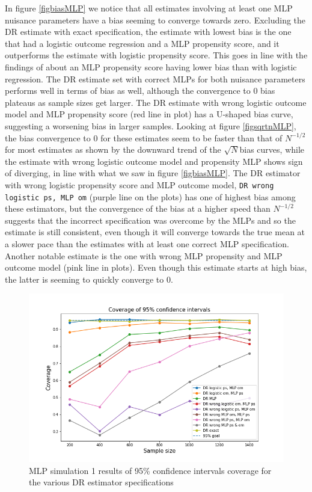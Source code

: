 \documentclass[12pt,twoside]{article}
\begin{document}
In figure \ref{figbiasMLP} we notice that all estimates involving at least one MLP nuisance parameters have a bias seeming to converge towards zero. Excluding the DR estimate with exact specification, the estimate with lowest bias is the one that had a logistic outcome regression and a MLP propensity score, and it outperforms the estimate with logistic propensity score. This goes in line with the findings of \citet{setoguchi-nn} about an MLP propensity score having lower bias than with logistic regression. The DR estimate set with correct MLPs for both nuisance parameters performs well in terms of bias as well, although the convergence to 0 bias plateaus as sample sizes get larger. The DR estimate with wrong logistic outcome model and MLP propensity score (red line in plot) has a U-shaped bias curve, suggesting a worsening bias in larger samples. Looking at figure \ref{figsqrtnMLP}, the bias convergence to 0 for these estimates seem to be faster than that of $N^{-1/2}$ for most estimates as shown by the downward trend of the $\sqrt{N}$bias curves, while the estimate with wrong logistic outcome model and propensity MLP shows sign of diverging, in line with what we saw in figure \ref{figbiasMLP}. The DR estimator with wrong logistic propensity score and MLP outcome model, \texttt{DR wrong logistic ps, MLP om} (purple line on the plots) has one of highest bias among these estimators, but the convergence of the bias at a higher speed than $N^{-1/2}$ suggests that the incorrect specification was overcome by the MLPs and so the estimate is still consistent, even though it will converge towards the true mean at a slower pace than the estimates with at least one correct MLP specification. Another notable estimate is the one with wrong MLP propensity and MLP outcome model (pink line in plots). Even though this estimate starts at high bias, the latter is seeming to quickly converge to 0.

\begin{figure}[h!]
    \centering
    \includegraphics[width = 0.9\columnwidth]{figures/CIMLP.png}
    \caption{MLP simulation 1 results of 95\% confidence intervals coverage for the various DR estimator specifications}
    \label{figCIMLP}
\end{figure}
\end{document}
